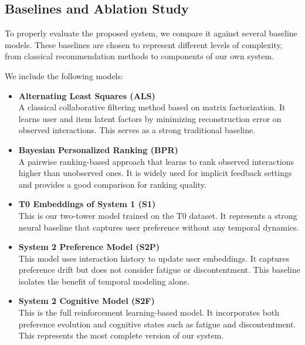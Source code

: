 \subsection{Baselines and Ablation Study}

To properly evaluate the proposed system, we compare it against several baseline models. 
These baselines are chosen to represent different levels of complexity, from classical recommendation methods to components of our own system.

We include the following models:

\begin{itemize}
    \item \textbf{Alternating Least Squares (ALS)} \\
        A classical collaborative filtering method based on matrix factorization. 
        It learns user and item latent factors by minimizing reconstruction error on observed interactions. 
        This serves as a strong traditional baseline.
    \item \textbf{Bayesian Personalized Ranking (BPR)} \\
        A pairwise ranking-based approach that learns to rank observed interactions higher than unobserved ones. 
        It is widely used for implicit feedback settings and provides a good comparison for ranking quality.
    \item \textbf{T0 Embeddings of System 1 (S1)} \\
        This is our two-tower model trained on the T0 dataset. 
        It represents a strong neural baseline that captures user preference without any temporal dynamics. 
    \item \textbf{System 2 Preference Model (S2P)} \\
        This model uses interaction history to update user embeddings. 
        It captures preference drift but does not consider fatigue or discontentment. 
        This baseline isolates the benefit of temporal modeling alone.
    \item \textbf{System 2 Cognitive Model (S2F)} \\
        This is the full reinforcement learning-based model. 
        It incorporates both preference evolution and cognitive states such as fatigue and discontentment. 
        This represents the most complete version of our system.
\end{itemize}          
